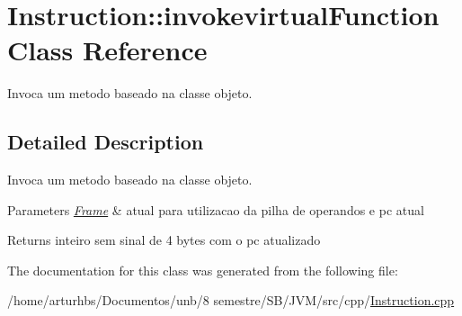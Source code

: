 \hypertarget{classInstruction_1_1invokevirtualFunction}{}\section{Instruction\+:\+:invokevirtual\+Function Class Reference}
\label{classInstruction_1_1invokevirtualFunction}


Invoca um metodo baseado na classe objeto.  




\subsection{Detailed Description}
Invoca um metodo baseado na classe objeto. 


\begin{DoxyParams}{Parameters}
{\em \hyperlink{classFrame}{Frame}} & atual para utilizacao da pilha de operandos e pc atual \\
\hline
\end{DoxyParams}
\begin{DoxyReturn}{Returns}
inteiro sem sinal de 4 bytes com o pc atualizado 
\end{DoxyReturn}


The documentation for this class was generated from the following file\+:\begin{DoxyCompactItemize}
\item 
/home/arturhbs/\+Documentos/unb/8 semestre/\+S\+B/\+J\+V\+M/src/cpp/\hyperlink{Instruction_8cpp}{Instruction.\+cpp}\end{DoxyCompactItemize}
